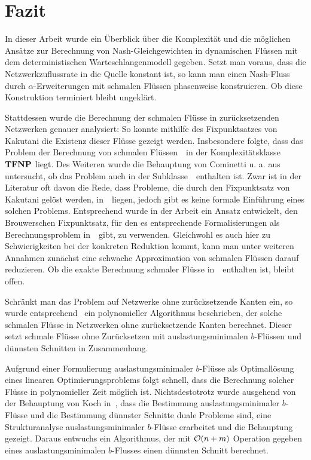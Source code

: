 \newenvironment{absolutelynopagebreak}
{\par\nobreak\vfil\penalty0\vfilneg
	\vtop\bgroup}
{\par\xdef\tpd{\the\prevdepth}\egroup
	\prevdepth=\tpd}

\chapter{Fazit}

In dieser Arbeit wurde ein Überblick über die Komplexität und die möglichen Ansätze zur Berechnung von Nash-Gleichgewichten in dynamischen Flüssen mit dem deterministischen Warteschlangenmodell gegeben.
Setzt man voraus, dass die Netzwerkzuflussrate in die Quelle konstant ist, so kann man einen Nash-Fluss durch $\alpha$-Erweiterungen mit schmalen Flüssen phasenweise konstruieren.
Ob diese Konstruktion terminiert bleibt ungeklärt.

Stattdessen wurde die Berechnung der schmalen Flüsse in zurücksetzenden Netzwerken genauer analysiert:
So konnte mithilfe des Fixpunktsatzes von Kakutani die Existenz dieser Flüsse gezeigt werden.
Insbesondere folgte, dass das Problem der Berechnung von schmalen Flüssen~\probTFwR\ in der Komplexitätsklasse~$\mathbf{TFNP}$ liegt.
Des Weiteren wurde die Behauptung von Cominetti u. a. aus~\cite{Cominetti2015} untersucht, ob das Problem auch in der Subklasse~\PPAD\ enthalten ist.
Zwar ist in der Literatur oft davon die Rede, dass Probleme, die durch den Fixpunktsatz von Kakutani gelöst werden, in~\PPAD\ liegen, jedoch gibt es keine formale Einführung eines solchen Problems.
Entsprechend wurde in der Arbeit ein Ansatz entwickelt, den Brouwerschen Fixpunktsatz, für den es entsprechende Formalisierungen als Berechnungsproblem in~\PPAD\ gibt, zu verwenden.
Gleichwohl es auch hier zu Schwierigkeiten bei der konkreten Reduktion kommt, kann man unter weiteren Annahmen zunächst eine schwache Approximation von schmalen Flüssen darauf reduzieren.
Ob die exakte Berechnung schmaler Flüsse in~\PPAD\ enthalten ist, bleibt offen.

Schränkt man das Problem auf Netzwerke ohne zurücksetzende Kanten ein, so wurde entsprechend~\cite{Koch2012} ein polynomieller Algorithmus beschrieben, der solche schmalen Flüsse in Netzwerken ohne zurücksetzende Kanten berechnet.
Dieser setzt schmale Flüsse ohne Zurücksetzen mit auslastungsminimalen $b$-Flüssen und dünnsten Schnitten in Zusammenhang.

Aufgrund einer Formulierung auslastungsminimaler $b$-Flüsse als Optimallösung eines linearen Optimierungsproblems folgt schnell, dass die Berechnung solcher Flüsse in polynomieller Zeit möglich ist.
Nichtsdestotrotz wurde ausgehend von der Behauptung von Koch in~\cite{Koch2012}, dass die Bestimmung auslastungsminimaler $b$-Flüsse und die Bestimmung dünnster Schnitte duale Probleme sind, eine Strukturanalyse auslastungsminimaler $b$-Flüsse erarbeitet und die Behauptung gezeigt.
Daraus entwuchs ein Algorithmus, der mit $\mathcal{O}(n+m)$ Operation gegeben eines auslastungsminimalen $b$-Flusses einen dünnsten Schnitt berechnet.

